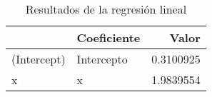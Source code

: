 \begin{table}[!h]

\caption{Resultados de la regresión lineal}
\centering
\begin{tabular}[t]{l|l|r}
\hline
  & Coeficiente & Valor\\
\hline
(Intercept) & Intercepto & 0.3100925\\
\hline
x & x & 1.9839554\\
\hline
\end{tabular}
\end{table}
